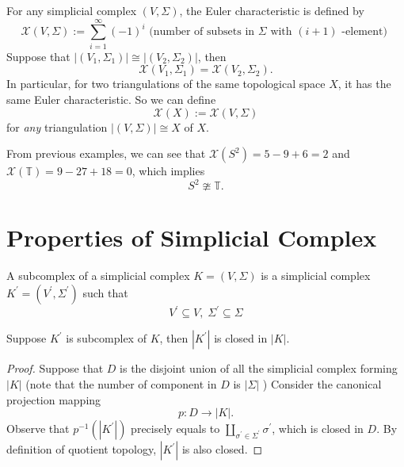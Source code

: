 \begin{theorem} \label{thm:euler_char}
For any simplicial complex $(V,\Sigma)$, the Euler characteristic is defined by
\[\mathcal{X}(V,\Sigma) :=
\mathop{\sum }\limits_{{i = 1}}^{\infty }{\left( -1\right) }^{i}\text{ (number of subsets in }{\Sigma }\text{ with }\left( {i + 1}\right) \text{ -element) }
\]
Suppose that \(\left| \left( {{V}_{1},{\Sigma }_{1}}\right) \right|  \cong  \left| \left( {{V}_{2},{\Sigma }_{2}}\right) \right|\), then
\[\mathcal{X}\left( {{V}_{1},{\Sigma }_{1}}\right) = \mathcal{X}\left( {{V}_{2},{\Sigma }_{2}}\right).
\]
In particular, for two triangulations of the same topological space $X$, it has the same Euler characteristic. So we can define
$$\mathcal{X}(X) := \mathcal{X}(V,\Sigma)$$
for \emph{any} triangulation $|(V,\Sigma)| \cong X$ of $X$.
\end{theorem}

From previous examples, we can see that \(\mathcal{X}\left( {S}^{2}\right)  = 5 - 9 + 6 = 2\) and \(\mathcal{X}\left( \mathbb{T}\right)  = 9 - {27} + {18} = 0\), which implies
\[
{S}^{2} \ncong \mathbb{T}.
\]

\section{Properties of Simplicial Complex}
\begin{definition} A subcomplex of a simplicial complex \(K = \left( {V,\Sigma }\right)\) is a simplicial complex \({K}^{\prime } = \left( {{V}^{\prime },{\Sigma }^{\prime }}\right)\) such that
\[
{V}^{\prime } \subseteq  V,\;{\Sigma }^{\prime } \subseteq  \Sigma
\]
\end{definition}

\begin{proposition} Suppose \({K}^{\prime }\) is subcomplex of \(K\), then \(\left| {K}^{\prime }\right|\) is closed in \(\left| K\right|\).
\end{proposition}
\begin{proof} Suppose that \(D\) is the disjoint union of all the simplicial complex forming \(\left| K\right|\) (note that the number of component in \(D\) is \(\left| \Sigma \right|\) )
Consider the canonical projection mapping 
\[p: D \rightarrow  \left| K\right|.\] Observe that \({p}^{-1}\left( \left| {K}^{\prime }\right| \right)\) precisely equals to \(\mathop{\coprod }\limits_{{{\sigma }^{\prime } \in  {\Sigma }^{\prime }}}{\sigma }^{\prime }\), which is closed in \(D\). By definition of quotient topology, \(\left| {K}^{\prime }\right|\) is also closed.
\end{proof}

